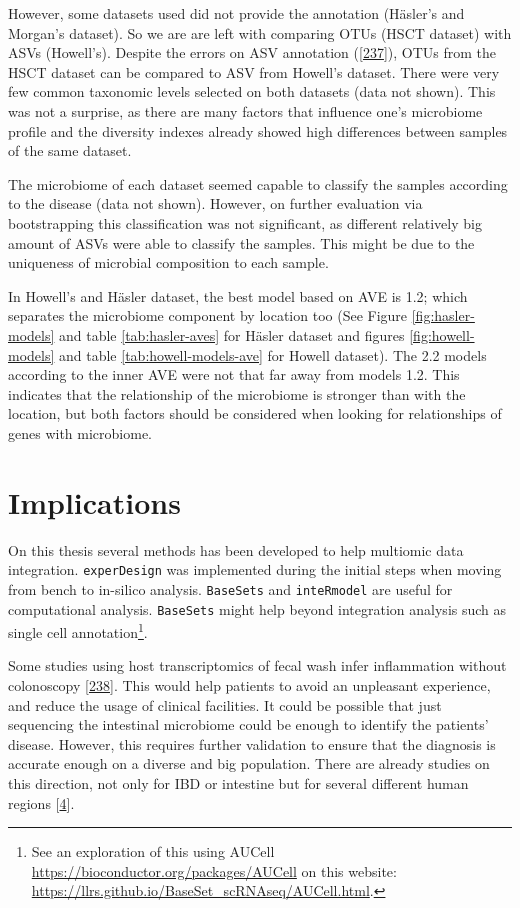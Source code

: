 \documentclass[
  12pt,
  a4paper,
  twoside,
  openright]{book}
\begin{document}
However, some datasets used did not provide the annotation (Häsler's and Morgan's dataset).
So we are are left with comparing OTUs (HSCT dataset) with ASVs (Howell's).
Despite the errors on ASV annotation ({[}\protect\hyperlink{ref-edgar2018}{237}{]}), OTUs from the HSCT dataset can be compared to ASV from Howell's dataset.
There were very few common taxonomic levels selected on both datasets (data not shown).
This was not a surprise, as there are many factors that influence one's microbiome profile and the diversity indexes already showed high differences between samples of the same dataset.

The microbiome of each dataset seemed capable to classify the samples according to the disease (data not shown).
However, on further evaluation via bootstrapping this classification was not significant, as different relatively big amount of ASVs were able to classify the samples.
This might be due to the uniqueness of microbial composition to each sample.

In Howell's and Häsler dataset, the best model based on AVE is 1.2; which separates the microbiome component by location too (See Figure \ref{fig:hasler-models} and table \ref{tab:hasler-aves} for Häsler dataset and figures \ref{fig:howell-models} and table \ref{tab:howell-models-ave} for Howell dataset).
The 2.2 models according to the inner AVE were not that far away from models 1.2.
This indicates that the relationship of the microbiome is stronger than with the location, but both factors should be considered when looking for relationships of genes with microbiome.

\hypertarget{implications}{%
\section{Implications}\label{implications}}

On this thesis several methods has been developed to help multiomic data integration.
\texttt{experDesign} was implemented during the initial steps when moving from bench to in-silico analysis.
\texttt{BaseSets} and \texttt{inteRmodel} are useful for computational analysis.
\texttt{BaseSets} might help beyond integration analysis such as single cell annotation\footnote{See an exploration of this using AUCell \url{https://bioconductor.org/packages/AUCell} on this website: \url{https://llrs.github.io/BaseSet_scRNAseq/AUCell.html}.}.

Some studies using host transcriptomics of fecal wash infer inflammation without colonoscopy {[}\protect\hyperlink{ref-ungar2022}{238}{]}.
This would help patients to avoid an unpleasant experience, and reduce the usage of clinical facilities.
It could be possible that just sequencing the intestinal microbiome could be enough to identify the patients' disease.
However, this requires further validation to ensure that the diagnosis is accurate enough on a diverse and big population.
There are already studies on this direction, not only for IBD or intestine but for several different human regions {[}\protect\hyperlink{ref-humanmicrobiomeprojectconsortium2012}{4}{]}.
\end{document}
